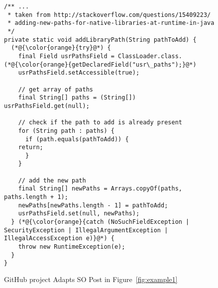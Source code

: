 \begin{figure}[htbp]
	\centering
\begin{lstlisting}[]
/** ...
 * taken from http://stackoverflow.com/questions/15409223/
 * adding-new-paths-for-native-libraries-at-runtime-in-java
 */
private static void addLibraryPath(String pathToAdd) {
  (*@{\color{orange}{try}@*) {
    final Field usrPathsField = ClassLoader.class.(*@{\color{orange}{getDeclaredField("usr\_paths");}@*)
    usrPathsField.setAccessible(true);

    // get array of paths
    final String[] paths = (String[]) usrPathsField.get(null);

    // check if the path to add is already present
    for (String path : paths) {
      if (path.equals(pathToAdd)) {
	return;
      }
    }

    // add the new path
    final String[] newPaths = Arrays.copyOf(paths, paths.length + 1);
    newPaths[newPaths.length - 1] = pathToAdd;
    usrPathsField.set(null, newPaths);
  } (*@{\color{orange}{catch (NoSuchFieldException | SecurityException | IllegalArgumentException |    IllegalAccessException e)}@*) {
	throw new RuntimeException(e);
  }
}
\end{lstlisting}
        \vspace{-12pt}
        \caption{GitHub project  Adapts SO Post in Figure~\ref{fig:example1}}
        \label{fig:example2}
\end{figure}
